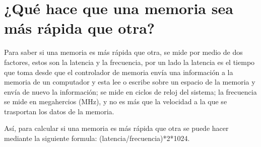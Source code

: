 \documentclass{article}
\begin{document}
\section{¿Qué hace que una memoria sea más rápida que otra?}
Para saber si una memoria es más rápida que otra, se mide por medio de dos factores, estos son la latencia y la frecuencia, por un lado la latencia es el tiempo que toma desde que el controlador de memoria envía una información  a la memoria de un computador y esta lee o escribe sobre un espacio de la memoria y envía de nuevo la información; se mide en ciclos de reloj del sistema\cite{Salazar}; la frecuencia se mide en megahercios (MHz), y no es más que la velocidad a la que se trasportan los datos de la memoria.\cite{computerhoy}
\vspace{0.5cm}

Así, para calcular si una memoria es más rápida que otra se puede hacer mediante la siguiente formula: (latencia/frecuencia)*2*1024.\cite{computerhoy}



\end{document}
